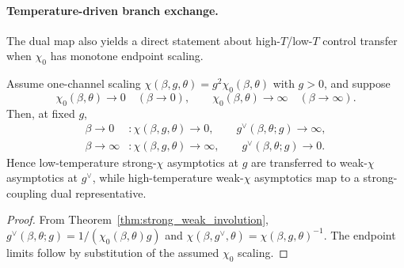 \paragraph{Temperature-driven branch exchange.}
The dual map also yields a direct statement about high-\(T\)/low-\(T\) control transfer when
\(\chi_0\) has monotone endpoint scaling.

\begin{corollary}
\label{cor:classical_quantum_exchange}
Assume one-channel scaling \(\chi(\beta,g,\theta)=g^2\chi_0(\beta,\theta)\) with \(g>0\), and
suppose
\begin{equation}
  \chi_0(\beta,\theta)\to 0 \quad (\beta\to 0),
  \qquad
  \chi_0(\beta,\theta)\to \infty \quad (\beta\to\infty).
\end{equation}
Then, at fixed \(g\),
\begin{align}
  \beta\to 0 &: \chi(\beta,g,\theta)\to 0, \qquad g^\vee(\beta,\theta;g)\to\infty, \\
  \beta\to\infty &: \chi(\beta,g,\theta)\to\infty, \qquad g^\vee(\beta,\theta;g)\to 0.
\end{align}
Hence low-temperature strong-\(\chi\) asymptotics at \(g\) are transferred to weak-\(\chi\)
asymptotics at \(g^\vee\), while high-temperature weak-\(\chi\) asymptotics map to a
strong-coupling dual representative.
\end{corollary}
\begin{proof}
From Theorem~\ref{thm:strong_weak_involution},
\(g^\vee(\beta,\theta;g)=1/(\chi_0(\beta,\theta)g)\) and
\(\chi(\beta,g^\vee,\theta)=\chi(\beta,g,\theta)^{-1}\). The endpoint limits follow by
substitution of the assumed \(\chi_0\) scaling.
\end{proof}
